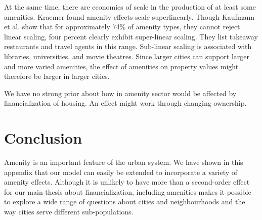At the same time, there are economies of scale in the production of at least some amenities. 
Kraemer \cite{kraemerCulturalSustainabilityUS2022} found amenity effects scale superlinearly. Though Kaufmann et al. \cite{kaufmannScalingUrbanAmenities2022}  show that %
for approximately 74\% of amenity types, they cannot reject linear scaling, four percent clearly exhibit super-linear scaling. They list takeaway restaurants and travel agents in this range. Sub-linear scaling is associated with libraries, universities, and movie theatres. Since larger cities can support larger and more varied amenities, the effect of amenities on property values might therefore be larger in larger cities.

 We have no strong prior about how in amenity sector would be affected by financialization of housing.  An effect might work through changing ownership.

  
\section{Conclusion}
Amenity is an important feature of the urban system. We have shown in this appendix that our model can easily be extended to incorporate a variety of amenity effects.  Although it is unlikely to have more than a second-order effect for our main thesis about financialization, including amenities makes it possible to explore a wide range of questions about cities and neighbourhoods and the way cities serve different sub-populations. 
\newpage

